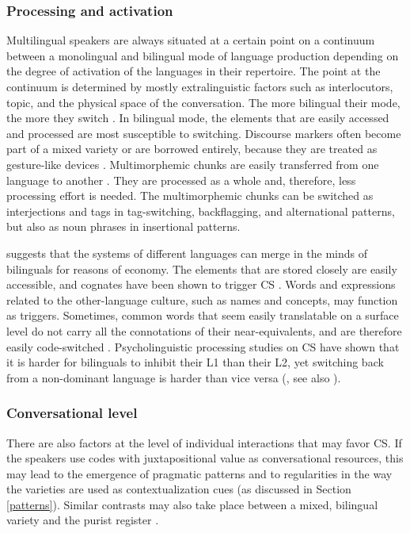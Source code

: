 \documentclass[output=paper]{langscibook}
\begin{document}
\subsubsection{Processing and activation}

Multilingual speakers are always situated at a certain point on a continuum between a monolingual and bilingual mode of language production depending on the degree of activation of the languages in their repertoire. The point at the continuum is determined by mostly extralinguistic factors such as interlocutors, topic, and the physical space of the conversation. The more bilingual their mode, the more they switch \parencite{grosjean1997processing}. In bilingual mode, the elements that are easily accessed and processed are most susceptible to switching. Discourse markers often become part of a mixed variety or are borrowed entirely, because they are treated as gesture-like devices \parencite[193]{matras2009language}. Multimorphemic chunks are easily transferred from one language to another \parencite{backus2003units}. They are processed as a whole and, therefore, less processing effort is needed. The multimorphemic chunks can be switched as interjections and tags in tag-switching, backflagging, and alternational patterns, but also as noun phrases in insertional patterns. 

\textcite{matras2011explaining} suggests that the systems of different languages can merge in the minds of bilinguals for reasons of economy. The elements that are stored closely are easily accessible, and cognates have been shown to trigger CS \parencite{clyne1967transference}. Words and expressions related to the other-language culture, such as names and concepts, may function as triggers. Sometimes, common words that seem easily translatable on a surface level do not carry all the connotations of their near-equivalents, and are therefore easily code-switched \parencites{backus2001role}[112]{matras2009language}. Psycholinguistic processing studies on CS have shown that it is harder for bilinguals to inhibit their L1 than their L2, yet switching back from a non-dominant language is harder than vice versa (\citealt[141]{gardner2009code}, see also \citealt{tomicetal2022expecting}).

\subsubsection{Conversational level}

There are also factors at the level of individual interactions that may favor CS. If the speakers use codes with juxtapositional value as conversational resources, this may lead to the emergence of pragmatic patterns and to regularities in the way the varieties are used as contextualization cues (as discussed in Section \ref{patterns}). Similar contrasts may also take place between a mixed, bilingual variety and the purist register \parencite{alvarez1998codeswitching,meeuwis1998monolectal}.
\end{document}
